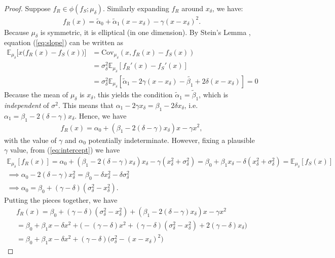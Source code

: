 \documentclass[11pt,dvipsnames]{article}
\newcommand{\Cov}{\mathrm{Cov}}
\begin{document}
\begin{appendix}
\begin{proof}
Suppose $f_R \in \phi(f_S;\mu_\delta)$.
Similarly expanding $f_R$ around $x_\delta$, we have:
\begin{align*}
f_R(x) = \tilde{\alpha}_0 + \tilde{\alpha}_1 (x-x_\delta)-\gamma(x-x_\delta)^2.	
\end{align*}
Because $\mu_\delta$ is symmetric, it is elliptical (in one dimension).
By Stein's Lemma \citep{landsman2008stein}, equation (\ref{eq:slope}) can be written as
\begin{align*}
\mathbb{E}_{\mu_\delta}\big[x\big(f_R(x)-f_S(x) \big)\big]
&= \Cov_{\mu_\delta}(x,f_R(x)-f_S(x))
\\
&=
\sigma_\delta^2 \mathbb{E}_{\mu_\delta}[f_R'(x)-f_S'(x)]
\\
&=
\sigma_\delta^2 \mathbb{E}_{\mu_\delta}[\tilde{\alpha}_1-2\gamma(x-x_\delta)-\tilde{\beta_1}+2\delta (x-x_\delta)]
= 0
\end{align*}
Because the mean of $\mu_\delta$ is $x_\delta$, this yields the condition $\tilde{\alpha}_1 = \tilde{\beta}_1$, which is \emph{independent} of $\sigma^2$.
This means that $\alpha_1-2\gamma x_\delta = \beta_1-2\delta x_\delta$, i.e. $\alpha_1 = \beta_1-2(\delta-\gamma)x_\delta$.
Hence, we have
\begin{align*}
f_R(x) = \alpha_0+(\beta_1-2(\delta-\gamma)x_\delta)x-\gamma x^2,
\end{align*}
with the value of $\gamma$ and $\alpha_0$ potentially indeterminate.
However, fixing a plausible $\gamma$ value, from (\ref{eq:intercept}) we have
\begin{align*}
\mathbb{E}_{\mu_\delta}[f_R(x)]
= \alpha_0+(\beta_1-2(\delta-\gamma)x_\delta)x_\delta-\gamma (x_\delta^2+\sigma_\delta^2)
= \beta_0+\beta_1x_\delta-\delta (x_\delta^2+\sigma_\delta^2)
= \mathbb{E}_{\mu_\delta}[f_S(x)]
\\
\implies
\alpha_0-2(\delta-\gamma)x_\delta^2=\beta_0-\delta x_\delta^2-\delta \sigma_\delta^2
\\
\implies \alpha_0 = \beta_0+(\gamma-\delta)(\sigma_\delta^2-x_\delta^2).
\end{align*}
Putting the pieces together, we have
\begin{align*}
f_R(x) = \beta_0+(\gamma-\delta)(\sigma_\delta^2-x_\delta^2)+(\beta_1-2(\delta-\gamma)x_\delta)x-\gamma x^2
\\
= \beta_0+\beta_1x-\delta x^2 + \big(-(\gamma-\delta)x^2 	
+(\gamma-\delta)(\sigma_\delta^2-x_\delta^2)+2(\gamma-\delta)x_\delta
\big)
\\
= \beta_0+\beta_1x-\delta x^2 + (\gamma-\delta)\big(\sigma_\delta^2-(x-x_\delta)^2\big)

\end{align*}
\end{proof}
\end{appendix}
\end{document}

